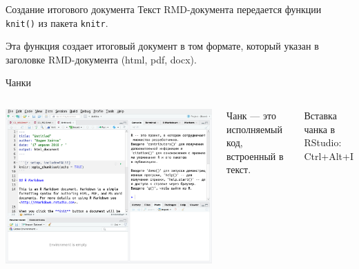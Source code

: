 \documentclass[
  10pt,
  ignorenonframetext,
  aspectratio=169,t,xcolor=table]{beamer}
\newcommand{\columnsbegin}{\vspace{-0.5\baselineskip}\begin{columns}[t,onlytextwidth]}
\newcommand{\columnsend}{\end{columns}}
\begin{document}
\begin{frame}[fragile]{Создание итогового документа}
\protect\hypertarget{ux441ux43eux437ux434ux430ux43dux438ux435-ux438ux442ux43eux433ux43eux432ux43eux433ux43e-ux434ux43eux43aux443ux43cux435ux43dux442ux430}{}
Текст RMD-документа передается функции \texttt{knit()} из пакета
\texttt{knitr}.

Эта функция создает итоговый документ в том формате, который указан в
заголовке RMD-документа (html, pdf, docx).
\end{frame}

\begin{frame}{Чанки}
\protect\hypertarget{ux447ux430ux43dux43aux438}{}
\columnsbegin
{}

\includegraphics[height=0.7\textheight,keepaspectratio]{./images/RMD_step_3_Ira.png}


Чанк --- это исполняемый код, встроенный в текст.

Вставка чанка в RStudio: Ctrl+Alt+I

\columnsend
\end{frame}
\end{document}
